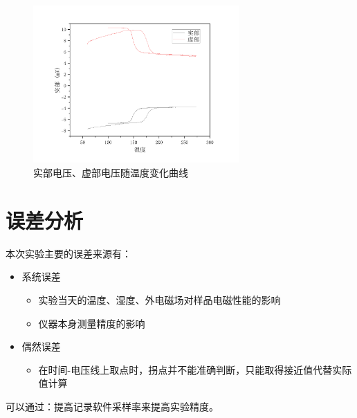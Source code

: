 \documentclass[a4paper,utf8]{article}
\begin{document}
    \begin{figure}[!ht]
        \includegraphics[width=0.7\textwidth]{fig9.pdf}
        \caption{实部电压、虚部电压随温度变化曲线}\label{fig:9}
    \end{figure}\par
\section{误差分析}
    本次实验主要的误差来源有：
    \begin{itemize}
        \item 系统误差
            \begin{itemize}
                \item 实验当天的温度、湿度、外电磁场对样品电磁性能的影响
                \item 仪器本身测量精度的影响
            \end{itemize}
        \item 偶然误差
            \begin{itemize}
                \item 在时间-电压线上取点时，拐点并不能准确判断，只能取得接近值代替实际值计算
            \end{itemize}
    \end{itemize}
    可以通过：提高记录软件采样率来提高实验精度。
\end{document}
